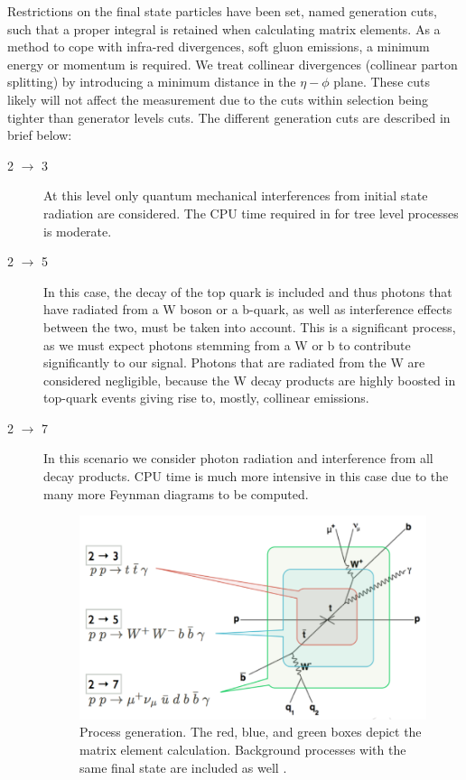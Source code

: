 Restrictions on the final state particles have been set, named generation cuts, such that a proper integral is retained when calculating matrix elements. As a method to cope with infra-red divergences, soft gluon emissions, a minimum energy or momentum is required. We treat collinear divergences (collinear parton splitting) by introducing a minimum distance in the $\eta - \phi$ plane. These cuts likely will not affect the measurement due to the cuts within selection being tighter than generator levels cuts. The different generation cuts are described in brief below:

\begin{description}
\item[2 $\to$ 3] At this level only quantum mechanical interferences from initial state radiation are considered. The CPU time required in for tree level processes is moderate.

\item[2 $\to$ 5] In this case, the decay of the top quark is included and thus photons that have radiated from a W boson or a b-quark, as well as interference effects between the two, must be taken into account. This is a significant process, as we must expect photons stemming from a W or b to contribute significantly to our signal. Photons that are radiated from the W are considered negligible, because the W decay products are highly boosted in top-quark events giving rise to, mostly, collinear emissions. 

\item[2 $\to$ 7] In this scenario we consider photon radiation and interference from all decay products. CPU time is much more intensive in this case due to the many more Feynman diagrams to be computed.                                                                            

\begin{figure} 
\begin{center}
\includegraphics[width=\textwidth]{Figures/MatrixElementCalculation.png}
\end{center}
\caption{Process generation. The red, blue, and green boxes depict the matrix element calculation. Background processes with the same final state are included as well \cite{heinerthesis}.}
\label{fig-MatrixElementCalculation}
\end{figure}
                               

\end{description}

